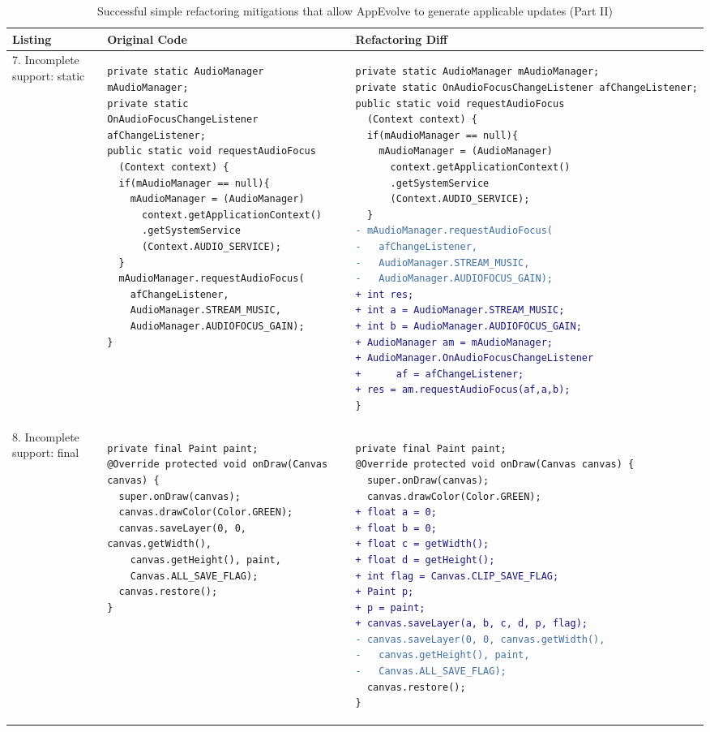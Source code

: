 \begin{table*}
\centering
\caption{Successful simple refactoring mitigations that allow AppEvolve to generate applicable updates (Part II)}\label{tab:mitigatesucc2}
\begin{tabular}{|p{}|p{}|p{}|}
\hline
\textbf{Listing}
  &
  \textbf{Original Code}
  &
  \textbf{Refactoring Diff}
 \\ \hline
7. Incomplete support: static
&
\begin{lstlisting}
private static AudioManager mAudioManager;
private static OnAudioFocusChangeListener afChangeListener;
public static void requestAudioFocus
  (Context context) {
  if(mAudioManager == null){
    mAudioManager = (AudioManager)
      context.getApplicationContext()
      .getSystemService
      (Context.AUDIO_SERVICE);
  }
  mAudioManager.requestAudioFocus(
    afChangeListener,
    AudioManager.STREAM_MUSIC,
    AudioManager.AUDIOFOCUS_GAIN);
}
\end{lstlisting}
&
\begin{lstlisting}[language=diff]
private static AudioManager mAudioManager;
private static OnAudioFocusChangeListener afChangeListener;
public static void requestAudioFocus
  (Context context) {
  if(mAudioManager == null){
    mAudioManager = (AudioManager)
      context.getApplicationContext()
      .getSystemService
      (Context.AUDIO_SERVICE);
  }
- mAudioManager.requestAudioFocus(
-   afChangeListener,
-   AudioManager.STREAM_MUSIC,
-   AudioManager.AUDIOFOCUS_GAIN);
+ int res;
+ int a = AudioManager.STREAM_MUSIC;
+ int b = AudioManager.AUDIOFOCUS_GAIN;
+ AudioManager am = mAudioManager;
+ AudioManager.OnAudioFocusChangeListener
+      af = afChangeListener;
+ res = am.requestAudioFocus(af,a,b);
}
\end{lstlisting}
\\ \hline
8. Incomplete support: final
&
\begin{lstlisting}
private final Paint paint;
@Override protected void onDraw(Canvas canvas) {
  super.onDraw(canvas);
  canvas.drawColor(Color.GREEN);
  canvas.saveLayer(0, 0, canvas.getWidth(),
    canvas.getHeight(), paint,
    Canvas.ALL_SAVE_FLAG);
  canvas.restore();
}
\end{lstlisting}
&
\begin{lstlisting}[language=diff]
private final Paint paint;
@Override protected void onDraw(Canvas canvas) {
  super.onDraw(canvas);
  canvas.drawColor(Color.GREEN);
+ float a = 0;
+ float b = 0;
+ float c = getWidth();
+ float d = getHeight();
+ int flag = Canvas.CLIP_SAVE_FLAG;
+ Paint p;
+ p = paint;
+ canvas.saveLayer(a, b, c, d, p, flag);
- canvas.saveLayer(0, 0, canvas.getWidth(),
-   canvas.getHeight(), paint,
-   Canvas.ALL_SAVE_FLAG);
  canvas.restore();
}
\end{lstlisting}
\\ \hline
		
\end{tabular}
\end{table*}


